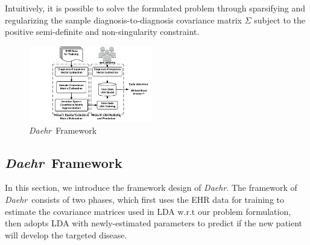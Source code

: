 \documentclass[journal,compsoc]{IEEEtran}
\newcommand{\TheName}{\mbox{\emph{Daehr}}}
\begin{document}
Intuitively, it is possible to solve the formulated problem through sparsifying and regularizing the sample diagnosis-to-diagnosis covariance matrix $\Sigma$ subject to the positive semi-definite and non-singularity constraint. 


\begin{figure}
\begin{center}
\includegraphics[width=0.48\textwidth]{./img/daehr.pdf}
\end{center}
\caption{\TheName\ Framework}
\end{figure}


\subsection{\TheName\ Framework}
In this section, we introduce the framework design of \TheName. The framework of \TheName\ consists of two phases, which first uses the EHR data for training to estimate the covariance matrices used in LDA w.r.t our problem formulation, then adopts LDA  with newly-estimated parameters to predict if the new patient will develop the targeted disease.
\end{document}
